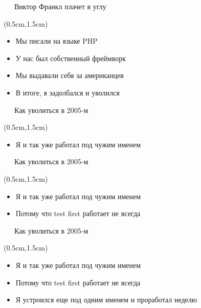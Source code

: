 \documentclass[xetex,18pt,aspectratio=43]{beamer}
\begin{document}
\begin{Large}
\begin{frame}{\ \ \ Виктор Франкл плачет в углу}
\begin{textblock*}{\framewidth-0.8cm}(0.5cm,1.5cm)
\begin{itemize}
  \item Мы писали на языке PHP
  \item У нас был собственный фреймворк
  \item Мы выдавали себя за американцев
  \item В итоге, я задолбался и уволился
\end{itemize}
\end{textblock*}
\end{frame}

\begin{frame}{\ \ \ Как уволиться в 2005-м}
\begin{textblock*}{\framewidth-0.8cm}(0.5cm,1.5cm)
\begin{itemize}
  \item Я и так уже работал под чужим именем
\end{itemize}
\end{textblock*}
\end{frame}

\begin{frame}{\ \ \ Как уволиться в 2005-м}
\begin{textblock*}{\framewidth-0.8cm}(0.5cm,1.5cm)
\begin{itemize}
  \item Я и так уже работал под чужим именем
  \item Потому что test first работает не всегда
\end{itemize}
\end{textblock*}
\end{frame}

\begin{frame}{\ \ \ Как уволиться в 2005-м}
\begin{textblock*}{\framewidth-0.8cm}(0.5cm,1.5cm)
\begin{itemize}
  \item Я и так уже работал под чужим именем
  \item Потому что test first работает не всегда
  \item Я устроился еще под одним именем и проработал неделю
\end{itemize}
\end{textblock*}
\end{frame}


\end{Large}
\end{document}
